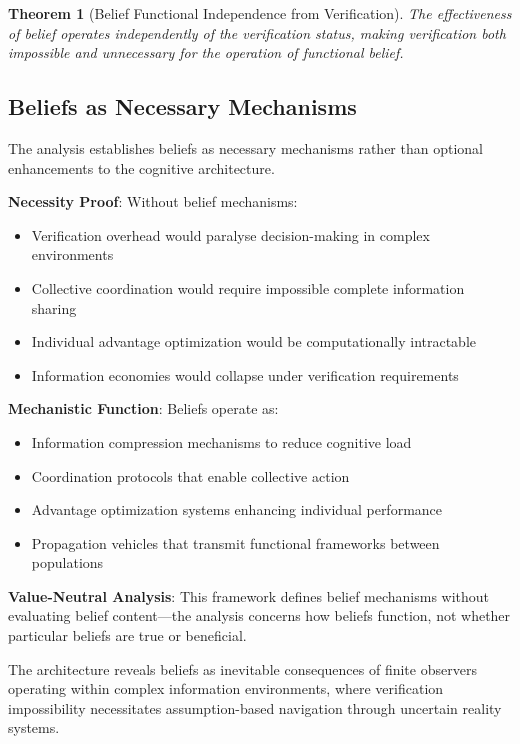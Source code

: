 \documentclass[12pt,a4paper]{article}
\newtheorem{theorem}{Theorem}
\begin{document}
\begin{theorem}[Belief Functional Independence from Verification]
The effectiveness of belief operates independently of the verification status, making verification both impossible and unnecessary for the operation of functional belief.
\end{theorem}

\subsection{Beliefs as Necessary Mechanisms}

The analysis establishes beliefs as necessary mechanisms rather than optional enhancements to the cognitive architecture.

\textbf{Necessity Proof}: Without belief mechanisms:
\begin{itemize}
\item Verification overhead would paralyse decision-making in complex environments
\item Collective coordination would require impossible complete information sharing
\item Individual advantage optimization would be computationally intractable  
\item Information economies would collapse under verification requirements
\end{itemize}

\textbf{Mechanistic Function}: Beliefs operate as:
\begin{itemize}
\item Information compression mechanisms to reduce cognitive load
\item Coordination protocols that enable collective action
\item Advantage optimization systems enhancing individual performance
\item Propagation vehicles that transmit functional frameworks between populations
\end{itemize}

\textbf{Value-Neutral Analysis}: This framework defines belief mechanisms without evaluating belief content—the analysis concerns how beliefs function, not whether particular beliefs are true or beneficial.

The architecture reveals beliefs as inevitable consequences of finite observers operating within complex information environments, where verification impossibility necessitates assumption-based navigation through uncertain reality systems.
\end{document}
